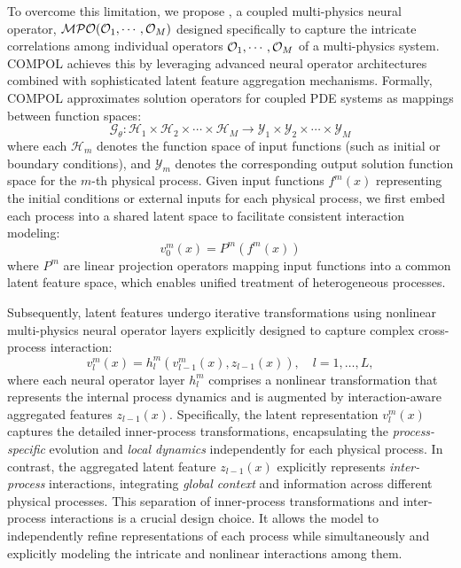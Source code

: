 To overcome this limitation, we propose \ours, a coupled multi-physics neural operator, $\mathcal{MPO}(\mathcal{O}_1, \cdots, \mathcal{O}_M)$ designed specifically to capture the intricate correlations among individual operators $\mathcal{O}_1, \cdots, \mathcal{O}_M$ of a multi-physics system. COMPOL achieves this by leveraging advanced neural operator architectures combined with sophisticated latent feature aggregation mechanisms. Formally, COMPOL approximates solution operators for coupled PDE systems as mappings between function spaces:
\[
	\mathcal{G}_\theta: \mathcal{H}_1 \times \mathcal{H}_2 \times \cdots \times \mathcal{H}_M \rightarrow \mathcal{Y}_1 \times \mathcal{Y}_2 \times \cdots \times \mathcal{Y}_M
\]
where each $\mathcal{H}_m$ denotes the function space of input functions (such as initial or boundary conditions), and $\mathcal{Y}_m$ denotes the corresponding output solution function space for the $m$-th physical process. Given input functions $f^m(x)$ representing the initial conditions or external inputs for each physical process, we first embed each process into a shared latent space to facilitate consistent interaction modeling:
\[
	v_0^m(x)=P^m\left(f^m(x)\right)
\]
where $P^m$ are linear projection operators mapping input functions into a common latent feature space, which enables unified treatment of heterogeneous processes. 

Subsequently, latent features undergo iterative transformations using nonlinear multi-physics neural operator layers explicitly designed to capture complex cross-process interaction:
\[
	v_l^m(x)=h_l^m\left(v_{l-1}^m(x), z_{l-1}(x)\right), \quad l=1, \ldots, L,
\]
where each neural operator layer $h_l^m$ comprises a nonlinear transformation that represents the internal process dynamics and is augmented by interaction-aware aggregated features $z_{l-1}(x)$. Specifically, the latent representation $v_l^m(x)$ captures the detailed inner-process transformations, encapsulating the \textit{process-specific} evolution and \textit{local dynamics} independently for each physical process. In contrast, the aggregated latent feature $z_{l-1}(x)$ explicitly represents \textit{inter-process} interactions, integrating \textit{global context} and information across different physical processes. This separation of inner-process transformations and inter-process interactions is a crucial design choice. It allows the model to independently refine representations of each process while simultaneously and explicitly modeling the intricate and nonlinear interactions among them.

